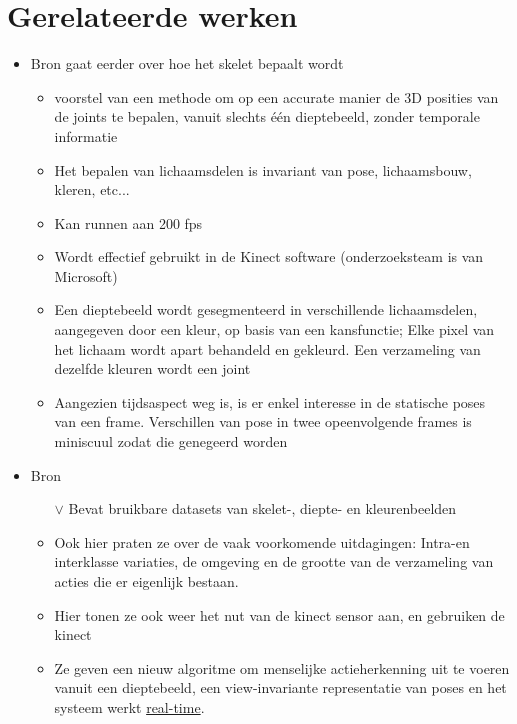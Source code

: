 \chapter{Gerelateerde werken}

\begin{itemize}
	\item Bron \cite{real-time-human-pose-recognition-in-parts-from-a-single-depth-image}
	gaat eerder over hoe het skelet bepaalt wordt
	\begin{itemize}
		\item voorstel van een methode om op een accurate manier de 3D posities van de joints te bepalen, vanuit slechts één dieptebeeld, zonder temporale informatie
		\item Het bepalen van lichaamsdelen is invariant van pose, lichaamsbouw, kleren, etc...
		\item Kan runnen aan 200 fps
		\item Wordt effectief gebruikt in de Kinect software (onderzoeksteam is van Microsoft)
		\item Een dieptebeeld wordt gesegmenteerd in verschillende lichaamsdelen, aangegeven door een kleur, op basis van een kansfunctie; Elke pixel van het lichaam wordt apart behandeld en gekleurd. Een verzameling van dezelfde kleuren wordt een joint
		\item Aangezien tijdsaspect weg is, is er enkel interesse in de statische poses van een frame. Verschillen van pose in twee opeenvolgende frames is miniscuul zodat die genegeerd worden
	\end{itemize}

	\item Bron \cite{xia2012view}
	\begin{itemize}
		\item[$\vee$] Bevat bruikbare datasets van skelet-, diepte- en kleurenbeelden
		\item Ook hier praten ze over de vaak voorkomende uitdagingen: Intra-en interklasse variaties, de omgeving en de grootte van de verzameling van acties die er eigenlijk bestaan.
		\item Hier tonen ze ook weer het nut van de kinect sensor aan, en gebruiken de kinect
		\item Ze geven een nieuw algoritme om menselijke actieherkenning uit te voeren vanuit een dieptebeeld, een view-invariante representatie van poses en het systeem werkt \underline{real-time}. 
		

\end{itemize}
\end{itemize}
